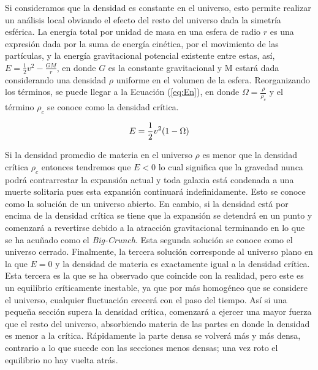 Si consideramos que la densidad es constante en el universo, esto permite realizar un análisis local obviando el efecto del resto del universo dada la simetría esférica. La energía total por unidad de masa en una esfera de radio $r$ es una expresión dada por la suma de energía cinética, por el movimiento de las partículas, y la energía gravitacional potencial existente entre estas, así, $E=\frac{1}{2}v^2-\frac{GM}{r}$, en donde $G$ es la constante gravitacional y M estará dada considerando una densidad $\rho$ uniforme en el volumen de la esfera. Reorganizando los términos, se puede llegar a la Ecuación (\ref{eq:En}), en donde $\Omega=\frac{\rho}{\rho_c}$ y el término $\rho_c$ se conoce como la densidad crítica.

\begin{equation}
E=\frac{1}{2}v^2(1-\Omega)\\
\label{eq:En}
\end{equation}

Si la densidad promedio de materia en el universo $\rho$ es menor que la densidad crítica $\rho_c$  entonces tendremos que $E<0$ lo cual significa que la gravedad nunca podrá contrarrestar la expansión actual y toda galaxia está condenada a una muerte solitaria pues esta expansión continuará indefinidamente. Esto se conoce como la solución de un universo abierto. En cambio, si la densidad está por encima de la densidad crítica se tiene que la expansión se detendrá en un punto y comenzará a revertirse debido a la atracción gravitacional terminando en lo que se ha acuñado como el \textit{Big-Crunch}. Esta segunda solución se conoce como el universo cerrado. Finalmente, la tercera solución corresponde al universo plano en la que $E=0$ y la densidad de materia es exactamente igual a la densidad crítica. Esta tercera es la que se ha observado que coincide con la realidad, pero este es un equilibrio críticamente inestable, ya que por más homogéneo que se considere el universo, cualquier fluctuación crecerá con el paso del tiempo. Así si una pequeña sección supera la densidad crítica, comenzará a ejercer una mayor fuerza que el resto del universo, absorbiendo materia de las partes en donde la densidad es menor a la crítica. Rápidamente la parte densa se volverá más y más densa, contrario a lo que sucede con las secciones menos densas; una vez roto el equilibrio no hay vuelta atrás.

